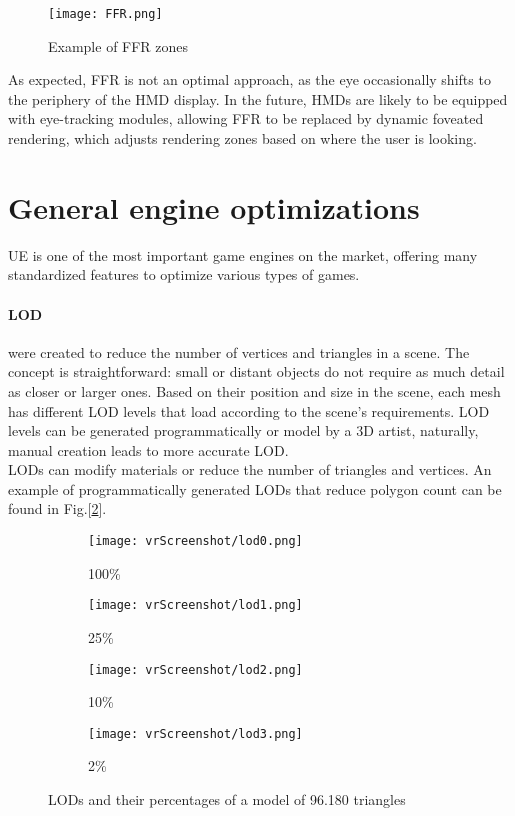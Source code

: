 \begin{figure}[ht]
  \centering
  \texttt{[image: FFR.png]}
  \caption{Example of FFR zones}
  \label{fig:FFR}
\end{figure}

\noindent
As expected, \ac{FFR} is not an optimal approach, as the eye occasionally shifts to the periphery of the \ac{HMD} display.
In the future, \ac{HMD}s are likely to be equipped with eye-tracking modules, allowing \ac{FFR} to be replaced by dynamic foveated rendering, which adjusts rendering zones based on where the user is looking.

\section{General engine optimizations}
\noindent
\ac{UE} is one of the most important game engines on the market, offering many standardized features to optimize various types of games.

\paragraph{\ac{LOD}}
were created to reduce the number of vertices and triangles in a scene.
The concept is straightforward: small or distant objects do not require as much detail as closer or larger ones. 
Based on their position and size in the scene, each mesh has different \ac{LOD} levels that load according to the scene's requirements.
\ac{LOD} levels can be generated programmatically or model by a 3D artist, naturally, manual creation leads to more accurate \ac{LOD}.\\
\ac{LOD}s can modify materials or reduce the number of triangles and vertices. An example of programmatically generated \ac{LOD}s that reduce polygon count can be found in Fig.[\ref{fig:lods}].

\captionsetup[subfigure]{labelformat=empty}
\begin{figure}[h]
  \centering
  \begin{subfigure}{0.24\textwidth}
      \texttt{[image: vrScreenshot/lod0.png]}
      \caption{100\%}
  \end{subfigure}
  \begin{subfigure}{0.24\textwidth}
      \texttt{[image: vrScreenshot/lod1.png]}
      \caption{25\%}
  \end{subfigure}
  \begin{subfigure}{0.24\textwidth}
      \texttt{[image: vrScreenshot/lod2.png]}
      \caption{10\%}
  \end{subfigure}
  \begin{subfigure}{0.24\textwidth}
      \texttt{[image: vrScreenshot/lod3.png]}
      \caption{2\%}
  \end{subfigure}
  \caption{LODs and their percentages of a model of 96.180 triangles}
  \label{fig:lods}
\end{figure}

